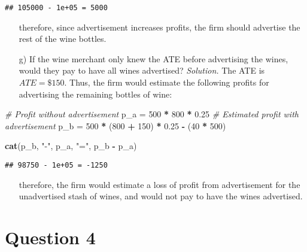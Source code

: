 \documentclass[
]{article}
\newenvironment{Shaded}{\begin{snugshade}}{\end{snugshade}}
\newcommand{\CommentTok}[1]{\textcolor[rgb]{0.56,0.35,0.01}{\textit{#1}}}
\newcommand{\DecValTok}[1]{\textcolor[rgb]{0.00,0.00,0.81}{#1}}
\newcommand{\FloatTok}[1]{\textcolor[rgb]{0.00,0.00,0.81}{#1}}
\newcommand{\KeywordTok}[1]{\textcolor[rgb]{0.13,0.29,0.53}{\textbf{#1}}}
\newcommand{\NormalTok}[1]{#1}
\newcommand{\OperatorTok}[1]{\textcolor[rgb]{0.81,0.36,0.00}{\textbf{#1}}}
\newcommand{\StringTok}[1]{\textcolor[rgb]{0.31,0.60,0.02}{#1}}
\begin{document}
\begin{verbatim}
## 105000 - 1e+05 = 5000
\end{verbatim}

\begin{enumerate}
\item[] therefore, since advertisement increases profits, the firm should advertise the rest of the wine bottles. 

\item[g)] If the wine merchant only knew the ATE before advertising the wines, would they pay to have all wines advertised?
\newline
\newline
\textit{Solution.}
The ATE is $ATE = \$150$. Thus, the firm would estimate the following profits for advertising the remaining bottles of wine:
\end{enumerate}

\begin{Shaded}
\begin{Highlighting}[]
\CommentTok{# Profit without advertisement }
\NormalTok{p_a =}\StringTok{ }\DecValTok{500} \OperatorTok{*}\StringTok{ }\DecValTok{800} \OperatorTok{*}\StringTok{ }\FloatTok{0.25}
\CommentTok{# Estimated profit with advertisement}
\NormalTok{p_b =}\StringTok{ }\DecValTok{500} \OperatorTok{*}\StringTok{ }\NormalTok{(}\DecValTok{800} \OperatorTok{+}\StringTok{ }\DecValTok{150}\NormalTok{) }\OperatorTok{*}\StringTok{ }\FloatTok{0.25} \OperatorTok{-}\StringTok{ }\NormalTok{(}\DecValTok{40} \OperatorTok{*}\StringTok{ }\DecValTok{500}\NormalTok{)}

\KeywordTok{cat}\NormalTok{(p_b, }\StringTok{"-"}\NormalTok{, p_a, }\StringTok{"="}\NormalTok{, p_b }\OperatorTok{-}\StringTok{ }\NormalTok{p_a)}
\end{Highlighting}
\end{Shaded}

\begin{verbatim}
## 98750 - 1e+05 = -1250
\end{verbatim}

\begin{enumerate}
\item[] therefore, the firm would estimate a loss of profit from advertisement for the unadvertised stash of wines, and would not pay to have the wines advertised. 
\end{enumerate}

\hypertarget{question-4}{%
\section{Question 4}\label{question-4}}
\end{document}
